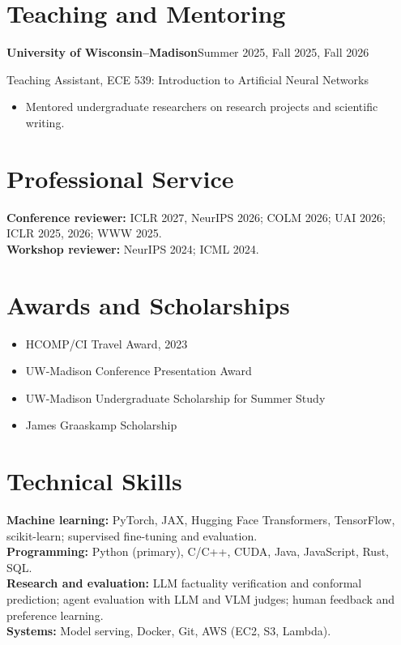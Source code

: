 \documentclass[11pt,letterpaper]{article}
\newcommand{\entry}[2]{\Needspace{4\baselineskip}\textbf{#1}\hfill #2\par}
\begin{document}
\section*{Teaching and Mentoring}
\entry{University of Wisconsin--Madison}{Summer 2025, Fall 2025, Fall 2026}
Teaching Assistant, ECE 539: Introduction to Artificial Neural Networks
\begin{itemize}
\item Mentored undergraduate researchers on research projects and scientific writing.
\end{itemize}

\section*{Professional Service}
\textbf{Conference reviewer:} ICLR 2027, NeurIPS 2026; COLM 2026; UAI 2026; ICLR 2025, 2026; WWW 2025.\\
\textbf{Workshop reviewer:} NeurIPS 2024; ICML 2024.

\section*{Awards and Scholarships}
\begin{itemize}[label={},leftmargin=0pt]
\item HCOMP/CI Travel Award, 2023
\item UW-Madison Conference Presentation Award
\item UW-Madison Undergraduate Scholarship for Summer Study
\item James Graaskamp Scholarship
\end{itemize}

\section*{Technical Skills}
\textbf{Machine learning:} PyTorch, JAX, Hugging Face Transformers, TensorFlow, scikit-learn; supervised fine-tuning and evaluation.\\
\textbf{Programming:} Python (primary), C/C++, CUDA, Java, JavaScript, Rust, SQL.\\
\textbf{Research and evaluation:} LLM factuality verification and conformal prediction; agent evaluation with LLM and VLM judges; human feedback and preference learning.\\
\textbf{Systems:} Model serving, Docker, Git, AWS (EC2, S3, Lambda).
\end{document}
